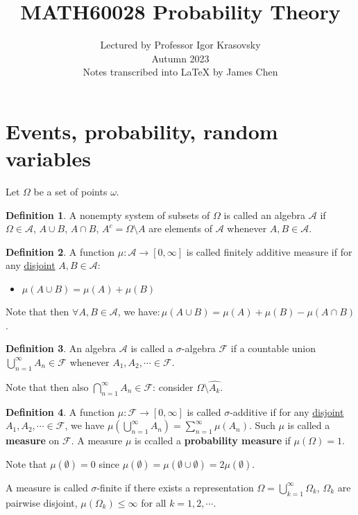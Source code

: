 \documentclass{article}
\title{MATH60028 Probability Theory}
\author{Lectured by Professor Igor Krasovsky\\
Autumn 2023\\
Notes transcribed into LaTeX by James Chen
}
\date{}
\numberwithin{equation}{section}
\theoremstyle{definition}
\newtheorem{definition}{Definition}[section]
\newcommand{\mc}[1]{\mathcal{#1}}
\newcommand{\sm}{\setminus}
\begin{document}
\maketitle


\section{Events, probability, random variables}

Let $\Omega$ be a set of points $\omega$.

\begin{definition}
    A nonempty system of subsets of $\Omega$ is called an algebra $\mc{A}$ if $\Omega \in \mc{A}$, $A \cup B$, $A \cap B$, $A^c = \Omega \sm A$ are elements of $\mc{A}$ whenever $A,B \in \mc{A}$.
\end{definition}
\begin{definition}
    A function $\mu: \mc{A} \rightarrow [0, \infty]$ is called finitely additive measure if for any \underline{disjoint} $A,B \in \mc{A}$:
    \begin{itemize}
        \item $\mu(A \cup B) = \mu(A) + \mu(B)$
    \end{itemize}
    Note that then $\forall A,B \in \mc{A}$, we have$:
    \mu(A \cup B) = \mu(A) + \mu(B) - \mu(A \cap B)$.
\end{definition}
\begin{definition}
    An algebra $\mc{A}$ is called a $\sigma$-algebra $\mc{F}$ if a countable union $\bigcup_{n=1}^\infty A_n \in \mc{F}$ whenever $A_1, A_2,\cdots \in \mc{F}$.
\end{definition}
Note that then also $\bigcap_{n=1}^\infty A_n \in \mc{F}$: consider $\Omega \sm \hat{A_k}$.
\begin{definition}
    A function $\mu: \mc{F}\rightarrow[0,\infty]$ is called $\sigma$-additive if for any \underline{disjoint} $A_1, A_2,\cdots \in \mc{F}$, we have $\mu(\bigcup_{n=1}^\infty A_n) = \sum_{n=1}^\infty \mu(A_n)$. Such $\mu$ is called a \textbf{measure} on $\mc{F}$. A measure $\mu$ is ccalled a \textbf{probability measure} if $\mu(\Omega) = 1$.
\end{definition}

Note that $\mu(\emptyset) = 0$ since $\mu(\emptyset) = \mu(\emptyset \cup \emptyset) = 2\mu(\emptyset)$.

A measure is called $\sigma$-finite if there exists a representation $\Omega = \bigcup_{k=1}^\infty \Omega_k$, $\Omega_k$ are pairwise disjoint, $\mu(\Omega_k) \le \infty$ for all $k=1,2,\cdots$.
\end{document}
